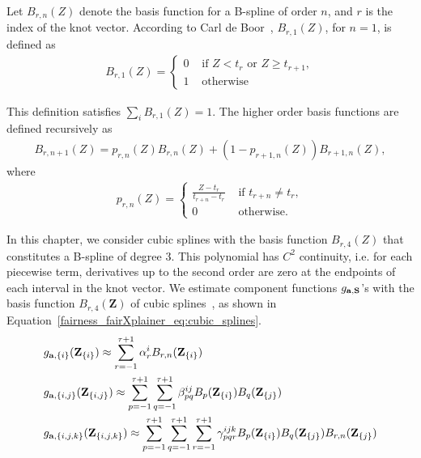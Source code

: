 Let $ B_{r, n}(Z) $ denote the basis function for a B-spline of order $ n $, and $ r $ is the index of the knot vector. According to Carl de Boor~\cite{de1971subroutine}, $ B_{r,1}(Z) $, for $ n = 1 $, is defined as
\begin{align*}
B_{r,1}(Z) = 
\begin{cases}
0 &\text{ if } Z < t_r \text{ or } Z \ge t_{r+1},\\
1 &\text{ otherwise}
\end{cases}
\end{align*}

This definition satisfies $ \sum_i B_{r, 1}(Z) = 1 $. The higher order basis functions are defined recursively as
\begin{align*}
	B_{r, n + 1}(Z) = p_{r, n}(Z)B_{r, n}(Z) + (1 - p_{r + 1, n}(Z))B_{r + 1, n}(Z),
\end{align*}
where 
\begin{align*}
p_{r,n}(Z) = 
\begin{cases}
\frac{Z - t_r}{t_{r + n} - t_r} &\text{ if } t_{r + n} \ne t_r,\\
0 &\text{ otherwise.}
\end{cases}
\end{align*}


In this chapter, we consider cubic splines with the basis function $ B_{r,4}(Z) $ that constitutes a B-spline of degree $ 3 $. This polynomial has $ C^2 $ continuity, i.e. for each piecewise term, derivatives up to the second order are zero at the endpoints of each interval in the knot vector. We estimate component functions $ g_{\mathbf{a}, \mathbf{S}} $'s with the basis function $ B_{r,4}(\mathbf{Z})  $ of cubic splines~\cite{li2010global}, as shown in Equation~\eqref{fairness_fairXplainer_eq:cubic_splines}.  
\begin{align}\label{fairness_fairXplainer_eq:cubic_splines}
\begin{split}
&g_{\mathbf{a}, \{i\}} (\mathbf{Z}_{\{i\}}) \approx \sum_{r=-1}^{\tau+1}\alpha_r^iB_{r,n}(\mathbf{Z}_{\{i\}})\\
&g_{\mathbf{a}, \{i, j\}} (\mathbf{Z}_{\{i, j\}}) \approx \sum_{p=-1}^{\tau+1}\sum_{q=-1}^{\tau+1}\beta_{pq}^{ij}B_p(\mathbf{Z}_{\{i\}})B_q(\mathbf{Z}_{\{j\}})\\
&g_{\mathbf{a}, \{i, j, k\}} (\mathbf{Z}_{\{i, j, k\}}) \approx \sum_{p=-1}^{\tau+1}\sum_{q=-1}^{\tau+1}\sum_{r=-1}^{\tau+1}\gamma_{pqr}^{ijk}B_p(\mathbf{Z}_{\{i\}})B_q(\mathbf{Z}_{\{j\}})B_{r,n}(\mathbf{Z}_{\{j\}})
\end{split}
\end{align}

